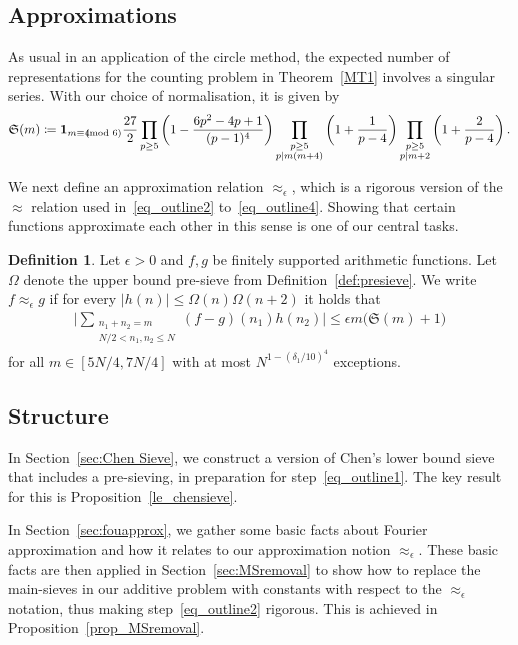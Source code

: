 \documentclass[12pt]{amsart}
\theoremstyle{definition}
\newtheorem{definition}[theorem]{Definition}
\theoremstyle{remark}
\numberwithin{equation}{section}
\newcommand{\1}{\mathbf{1}}
\let\oldpmod\pmod
\renewcommand{\pmod}[1]{\hspace{-0.12cm}\oldpmod {#1}}
\begin{document}
\subsection{Approximations}
As usual in an application of the circle method, the expected number of representations for the counting problem in Theorem~\ref{MT1} involves a singular series. With our choice of normalisation, it is given by
\begin{align}\label{eq:singserdef}
    \mathfrak{S}(m)\coloneqq \1_{m\equiv 4\pmod 6}\frac{27}{2}\prod_{p\geq 5}\left(1-\frac{6p^2-4p+1}{(p-1)^4}\right)\prod_{\substack{p\geq 5\\ p\mid m(m+4)}}\left(1+\frac{1}{p-4}\right)\prod_{\substack{p\geq 5\\ p\mid m+2}}\left(1+\frac{2}{p-4}\right).
\end{align}

We next define an approximation relation $\approx_\epsilon$, which is a rigorous version of the $\approx$ relation used in~\eqref{eq_outline2} to~\eqref{eq_outline4}. Showing that certain functions approximate each other in this sense is one of our central tasks.




\begin{definition}\label{def_approx}
    Let $\epsilon>0$ and $f, g$ be finitely supported arithmetic functions. Let $\Omega$ denote the upper bound pre-sieve from Definition~\ref{def:presieve}. We write $f\approx_{\epsilon} g$ if for every $|h(n)|\leq \Omega(n)\Omega(n+2)$ it holds that
    \begin{align*}
		\bigl|\sum_{\substack{n_1+n_2=m\\ N/2< n_1,n_2\leq N}}(f-g)(n_1) h(n_2)\bigr| \leq  \epsilon  m \bigl(\mathfrak{S}(m)+1\bigr)
	\end{align*}
    for all $m\in [5N/4,7N/4]$ with at most $N^{1-(\delta_1/10)^{4}}$ exceptions. 
\end{definition}


\subsection{Structure}


In Section~\ref{sec:Chen Sieve}, we construct a version of Chen's lower bound sieve that includes a pre-sieving, in preparation for step~\eqref{eq_outline1}. The key result for this is Proposition~\ref{le_chensieve}. 

In Section~\ref{sec:fouapprox}, we gather some basic facts about Fourier approximation and how it relates to our approximation notion $\approx_\epsilon$. These basic facts are then applied in Section~\ref{sec:MSremoval} to show how to replace the main-sieves in our additive problem with constants with respect to the $\approx_\epsilon$ notation, thus making step~\eqref{eq_outline2} rigorous. This is achieved in Proposition~\ref{prop_MSremoval}. 
\end{document}
